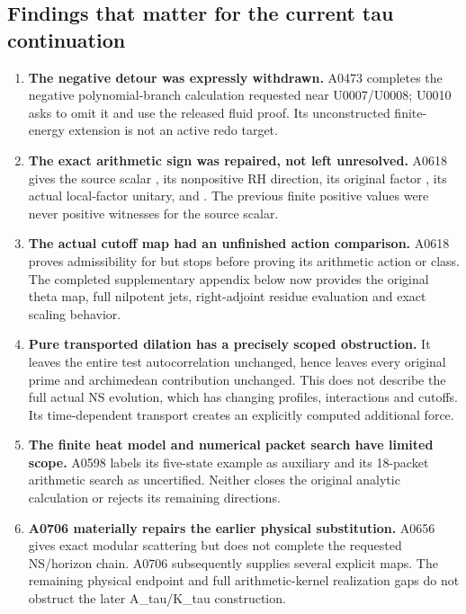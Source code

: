 \documentclass[10pt,a4paper,oneside]{report}
\providecommand{\tightlist}{\setlength{\itemsep}{0pt}\setlength{\parskip}{0pt}}
\begin{document}
\subsection{Findings that matter for the current tau
continuation}\label{findings-that-matter-for-the-current-tau-continuation}

\begin{enumerate}
\def\labelenumi{\arabic{enumi}.}
\tightlist
\item
  \textbf{The negative detour was expressly withdrawn.} A0473 completes
  the negative polynomial-branch calculation requested near U0007/U0008;
  U0010 asks to omit it and use the released fluid proof. Its
  unconstructed finite-energy extension is not an active redo target.
\item
  \textbf{The exact arithmetic sign was repaired, not left unresolved.}
  A0618 gives the source scalar \protect{}, its
  nonpositive RH direction, its original factor \protect{}, its
  actual local-factor unitary, and
  \protect{}. The previous finite positive
  values were never positive witnesses for the source scalar.
\item
  \textbf{The actual cutoff map had an unfinished action comparison.}
  A0618 proves admissibility for \protect{} but
  stops before proving its arithmetic action or class. The completed
  supplementary appendix below now provides the original theta map, full
  nilpotent jets, right-adjoint residue evaluation and exact scaling
  behavior.
\item
  \textbf{Pure transported dilation has a precisely scoped obstruction.}
  It leaves the entire test autocorrelation unchanged, hence leaves
  every original prime and archimedean contribution unchanged. This does
  not describe the full actual NS evolution, which has changing
  profiles, interactions and cutoffs. Its time-dependent transport
  creates an explicitly computed additional force.
\item
  \textbf{The finite heat model and numerical packet search have limited
  scope.} A0598 labels its five-state example as auxiliary and its
  18-packet arithmetic search as uncertified. Neither closes the
  original analytic calculation or rejects its remaining directions.
\item
  \textbf{A0706 materially repairs the earlier physical substitution.}
  A0656 gives exact modular scattering but does not complete the
  requested NS/horizon chain. A0706 subsequently supplies several
  explicit maps. The remaining physical endpoint and full
  arithmetic-kernel realization gaps do not obstruct the later
  A\_tau/K\_tau construction.
\end{enumerate}
\end{document}
